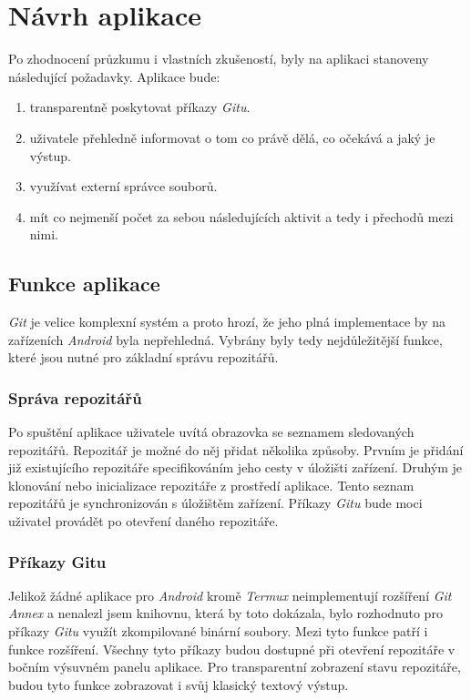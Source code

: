 \chapter{Návrh aplikace}
Po zhodnocení průzkumu i vlastních zkušeností, byly na aplikaci stanoveny následující požadavky. Aplikace bude:
\begin{enumerate}
    \item transparentně poskytovat příkazy \emph{Gitu}.
    \item uživatele přehledně informovat o tom co právě dělá, co očekává a jaký je výstup.
    \item využívat externí správce souborů.
    \item mít co nejmenší počet za sebou následujících aktivit a tedy i přechodů mezi nimi.
\end{enumerate}

\section{Funkce aplikace}
\emph{Git} je velice komplexní systém a proto hrozí, že jeho plná implementace by na zařízeních \emph{Android} byla nepřehledná. Vybrány byly tedy nejdůležitější funkce, které jsou nutné pro základní správu repozitářů.

    \subsection{Správa repozitářů}
    Po spuštění aplikace uživatele uvítá obrazovka se seznamem sledovaných repozitářů. Repozitář je možné do něj přidat několika způsoby. Prvním je přidání již existujícího repozitáře specifikováním jeho cesty v úložišti zařízení. Druhým je klonování nebo inicializace repozitáře z prostředí aplikace. Tento seznam repozitářů je synchronizován s úložištěm zařízení. Příkazy \emph{Gitu} bude moci uživatel provádět po otevření daného repozitáře.

    \newpage
    \subsection{Příkazy Gitu}
    Jelikož žádné aplikace pro \emph{Android} kromě \emph{Termux} neimplementují rozšíření \emph{Git Annex} a nenalezl jsem knihovnu, která by toto dokázala, bylo rozhodnuto pro příkazy \emph{Gitu} využít zkompilované binární soubory. Mezi tyto funkce patří i funkce rozšíření. Všechny tyto příkazy budou dostupné při otevření repozitáře v bočním výsuvném panelu aplikace. Pro transparentní zobrazení stavu repozitáře, budou tyto funkce zobrazovat i svůj klasický textový výstup.

